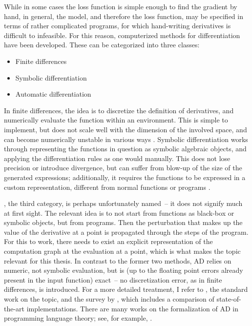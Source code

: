 While in some cases the loss function is simple enough to find the gradient by hand, in general, the
model, and therefore the loss function, may be specified in terms of rather complicated programs,
for which hand-writing derivatives is difficult to infeasible.  For this reason, computerized
methods for differentiation have been developed.  These can be categorized into three classes:
\begin{itemize}
  \firmlist
\item Finite differences
\item Symbolic differentiation
\item Automatic differentiation
\end{itemize}
In finite differences, the idea is to discretize the definition of derivatives, and numerically
evaluate the function within an environment.  This is simple to implement, but does not scale well
with the dimension of the involved space, and can become numerically unstable in various ways
\parencite[section 5.7]{press2007numerical}.  Symbolic differentiation works through representing
the functions in question as symbolic algebraic objects, and applying the differentiation rules as
one would manually.  This does not lose precision or introduce divergence, but can suffer from
blow-up of the size of the generated expressions; additionally, it requires the functions to be
expressed in a custom representation, different from normal functions or programs
\parencite{baydin2018automatic}.

, the third category, is perhaps unfortunately named~-- it
does not signify much at first sight.  The relevant idea is to not start from functions as black-box
or symbolic objects, but from programs.  Then the perturbation that makes up the value of the
derivative at a point is propagated through the steps of the program.  For this to work, there needs
to exist an explicit representation of the computation graph at  the evaluation at a point, which
is what makes the topic relevant for this thesis.  In contrast to the former two methods, AD relies
on numeric, not symbolic evaluation, but is (up to the floating point errors already present in the
input function) exact~-- no discretization error, as in finite differences, is introduced.  For a
more detailed treatment, I refer to \textcite{griewank2008evaluating}, the standard work on the
topic, and the survey by \textcite{baydin2018automatic}, which includes a comparison of
state-of-the-art implementations.  There are many works on the formalization of AD in programming
language theory; see, for example, \textcite{abadi2020simple}.

